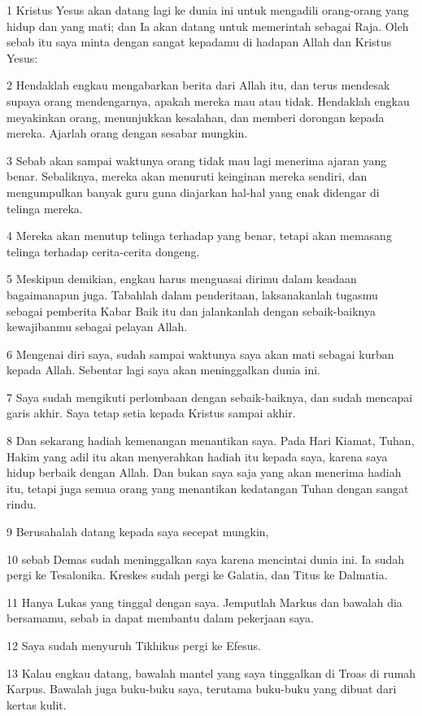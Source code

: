 \par 1 Kristus Yesus akan datang lagi ke dunia ini untuk mengadili orang-orang yang hidup dan yang mati; dan Ia akan datang untuk memerintah sebagai Raja. Oleh sebab itu saya minta dengan sangat kepadamu di hadapan Allah dan Kristus Yesus:
\par 2 Hendaklah engkau mengabarkan berita dari Allah itu, dan terus mendesak supaya orang mendengarnya, apakah mereka mau atau tidak. Hendaklah engkau meyakinkan orang, menunjukkan kesalahan, dan memberi dorongan kepada mereka. Ajarlah orang dengan sesabar mungkin.
\par 3 Sebab akan sampai waktunya orang tidak mau lagi menerima ajaran yang benar. Sebaliknya, mereka akan menuruti keinginan mereka sendiri, dan mengumpulkan banyak guru guna diajarkan hal-hal yang enak didengar di telinga mereka.
\par 4 Mereka akan menutup telinga terhadap yang benar, tetapi akan memasang telinga terhadap cerita-cerita dongeng.
\par 5 Meskipun demikian, engkau harus menguasai dirimu dalam keadaan bagaimanapun juga. Tabahlah dalam penderitaan, laksanakanlah tugasmu sebagai pemberita Kabar Baik itu dan jalankanlah dengan sebaik-baiknya kewajibanmu sebagai pelayan Allah.
\par 6 Mengenai diri saya, sudah sampai waktunya saya akan mati sebagai kurban kepada Allah. Sebentar lagi saya akan meninggalkan dunia ini.
\par 7 Saya sudah mengikuti perlombaan dengan sebaik-baiknya, dan sudah mencapai garis akhir. Saya tetap setia kepada Kristus sampai akhir.
\par 8 Dan sekarang hadiah kemenangan menantikan saya. Pada Hari Kiamat, Tuhan, Hakim yang adil itu akan menyerahkan hadiah itu kepada saya, karena saya hidup berbaik dengan Allah. Dan bukan saya saja yang akan menerima hadiah itu, tetapi juga semua orang yang menantikan kedatangan Tuhan dengan sangat rindu.
\par 9 Berusahalah datang kepada saya secepat mungkin,
\par 10 sebab Demas sudah meninggalkan saya karena mencintai dunia ini. Ia sudah pergi ke Tesalonika. Kreskes sudah pergi ke Galatia, dan Titus ke Dalmatia.
\par 11 Hanya Lukas yang tinggal dengan saya. Jemputlah Markus dan bawalah dia bersamamu, sebab ia dapat membantu dalam pekerjaan saya.
\par 12 Saya sudah menyuruh Tikhikus pergi ke Efesus.
\par 13 Kalau engkau datang, bawalah mantel yang saya tinggalkan di Troas di rumah Karpus. Bawalah juga buku-buku saya, terutama buku-buku yang dibuat dari kertas kulit.
